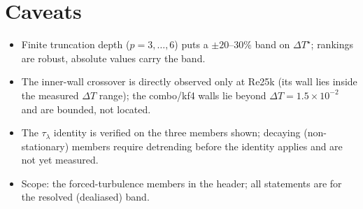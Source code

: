 \documentclass[11pt]{article}
\theoremstyle{remark}
\newcommand{\DT}{\Delta T}
\newcommand{\DTs}{\Delta T^{\star}}
\newcommand{\taul}{\tau_{\lambda}}
\begin{document}
\section{Caveats}\label{sec:caveats}

\begin{itemize}
\item Finite truncation depth ($p = 3,\dots,6$) puts a $\pm20$--$30\%$ band
on $\DTs$; rankings are robust, absolute values carry the band.
\item The inner-wall crossover is directly observed only at Re25k (its wall
lies inside the measured $\DT$ range); the combo/kf4 walls lie beyond
$\DT = 1.5\times10^{-2}$ and are bounded, not located.
\item The $\taul$ identity is verified on the three members shown; decaying
(non-stationary) members require detrending before the identity applies and
are not yet measured.
\item Scope: the forced-turbulence members in the header; all statements are
for the resolved (dealiased) band.
\end{itemize}
\end{document}
